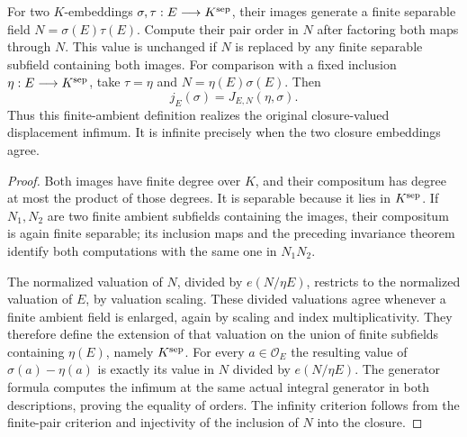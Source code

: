 \begin{lemma}
\label{fw:embedding-order-finite-ambient}
\leanok
For two $K$-embeddings $\sigma,\tau:E\longrightarrow K^{\rm sep}$,
their images generate a finite separable field
$N=\sigma(E)\tau(E)$. Compute their pair order in $N$ after
factoring both maps through $N$. This value is unchanged if $N$
is replaced by any finite separable subfield containing both
images. For comparison with a fixed inclusion
$\eta:E\longrightarrow K^{\rm sep}$, take $\tau=\eta$ and
$N=\eta(E)\sigma(E)$. Then
\[
 j_E(\sigma)=J_{E,N}(\eta,\sigma).
\]
Thus this finite-ambient definition realizes the original
closure-valued displacement infimum. It is infinite precisely
when the two closure embeddings agree.
\end{lemma}
\begin{proof}
Both images have finite degree over $K$, and their compositum has
degree at most the product of those degrees. It is separable
because it lies in $K^{\rm sep}$. If $N_1,N_2$ are two finite
ambient subfields containing the images, their compositum is
again finite separable; its inclusion maps and the preceding
invariance theorem identify both computations with the same
one in $N_1N_2$.

The normalized valuation of $N$, divided by $e(N/\eta E)$,
restricts to the normalized valuation of $E$, by valuation
scaling. These divided valuations agree whenever a finite
ambient field is enlarged, again by scaling and index
multiplicativity. They therefore define the extension of that
valuation on the union of finite subfields containing $\eta(E)$, namely
$K^{\rm sep}$. For every $a\in\mathcal O_E$ the resulting
value of $\sigma(a)-\eta(a)$ is exactly its value in $N$
divided by $e(N/\eta E)$. The generator formula computes the
infimum at the same actual integral generator in both
descriptions, proving the equality of orders. The infinity
criterion follows from the finite-pair criterion and injectivity
of the inclusion of $N$ into the closure.
\end{proof}


